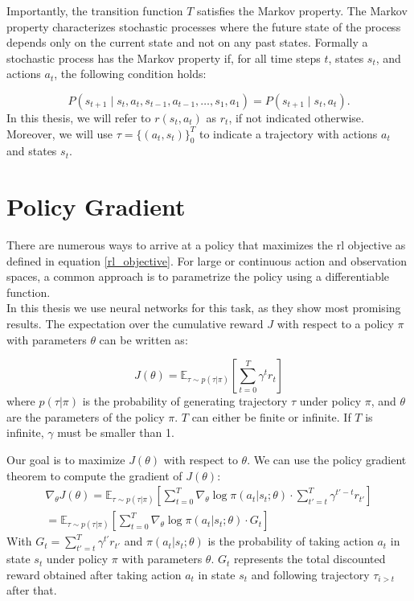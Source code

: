 Importantly, the transition function $T$ satisfies the Markov property. The Markov property characterizes stochastic processes where the future state of the 
process depends only on the current state and not on any past states. Formally a stochastic process has the Markov property if, 
for all time steps $t$, states $s_t$, and actions $a_t$, the following condition holds:

\begin{equation*}
    P(s_{t+1} \mid s_t, a_t, s_{t-1}, a_{t-1}, \ldots, s_1, a_1) = P(s_{t+1} \mid s_t, a_t).
\end{equation*}
In this thesis, we will refer to $r(s_t, a_t)$ as $r_t$, if not indicated otherwise. Moreover, we will use $\tau = \{(a_t, s_t)\}_0^T$ to 
indicate a trajectory with actions $a_t$ and states $s_t$.



\section{Policy Gradient}
There are numerous ways to arrive at a policy that maximizes the \ac{rl} objective as defined in equation 
\ref{rl_objective}. For large or continuous action and observation spaces, a common approach is 
to parametrize the policy using a differentiable function.\\ 
In this thesis we use neural networks for this task, as they show most promising results. The expectation over the cumulative 
reward $J$ with respect to a policy $\pi$ with parameters $\theta$ can be written as:

\begin{equation}
J(\theta) = \mathbb{E}_{\tau \sim p(\tau | \pi)} \left[ \sum_{t=0}^T \gamma^t r_t \right]
\end{equation}
where  $p(\tau | \pi)$ is the probability of generating trajectory $\tau$ under policy $\pi$, and $\theta$ are the parameters of the policy $\pi$. 
$T$ can either be finite or infinite. If $T$ is infinite, $\gamma$ must be smaller than 1.

Our goal is to maximize $J(\theta)$ with respect to $\theta$. We can use the policy gradient theorem to compute the gradient of $J(\theta)$:
\begin{equation}
    \label{nabla_reinforce}
    \begin{aligned}
        \nabla_{\theta} J(\theta) = \mathbb{E}_{\tau \sim p(\tau | \pi)} \left[ \sum_{t=0}^T \nabla_{\theta} \log \pi(a_t|s_t;\theta) \cdot \sum_{t'=t}^T \gamma^{t'-t} r_{t'} \right]\\
        = \mathbb{E}_{\tau \sim p(\tau | \pi)} \left[ \sum_{t=0}^T \nabla_{\theta} \log \pi(a_t|s_t;\theta) \cdot  G_t\right]
    \end{aligned}
\end{equation}
With $G_t = \sum_{t'=t}^T \gamma^{t'} r_{t'}$ and $\pi(a_t|s_t;\theta)$ is the probability of taking action $a_t$ in state $s_t$ under policy $\pi$ with parameters $\theta$. 
$G_t$ represents the total discounted reward obtained after taking action $a_t$ in state $s_t$ and following trajectory $\tau_{i>t}$ after that.

